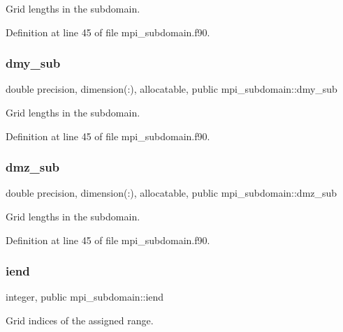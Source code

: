 Grid lengths in the subdomain. 



Definition at line 45 of file mpi\+\_\+subdomain.\+f90.

\mbox{\label{namespacempi__subdomain_ae44efbff9669bfad03a79ab41b5e8ace}} 
\subsubsection{\texorpdfstring{dmy\_sub}{dmy\_sub}}
{\footnotesize\ttfamily double precision, dimension(\+:), allocatable, public mpi\+\_\+subdomain\+::dmy\+\_\+sub}



Grid lengths in the subdomain. 



Definition at line 45 of file mpi\+\_\+subdomain.\+f90.

\mbox{\label{namespacempi__subdomain_afb6341d7362587d6fd0a06fe78ba4e3f}} 
\subsubsection{\texorpdfstring{dmz\_sub}{dmz\_sub}}
{\footnotesize\ttfamily double precision, dimension(\+:), allocatable, public mpi\+\_\+subdomain\+::dmz\+\_\+sub}



Grid lengths in the subdomain. 



Definition at line 45 of file mpi\+\_\+subdomain.\+f90.

\mbox{\label{namespacempi__subdomain_abbd7d35107c53bcfd2b2b52771f4aa67}} 
\subsubsection{\texorpdfstring{iend}{iend}}
{\footnotesize\ttfamily integer, public mpi\+\_\+subdomain\+::iend}



Grid indices of the assigned range. 



